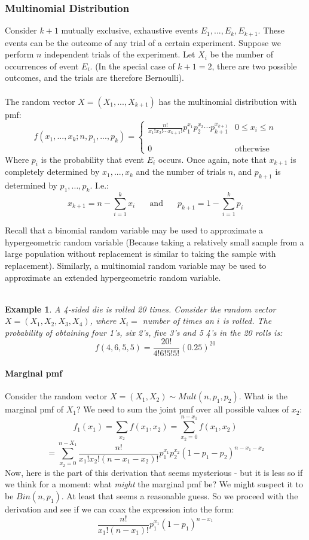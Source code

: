 \documentclass[12pt]{article} %
\newtheorem{example}{Example}
\begin{document}
\subsubsection{Multinomial Distribution}
Consider $k+1$ mutually exclusive, exhaustive events $E_1,...,E_k,E_{k+1}$. These events can be the outcome of any trial of a certain experiment. Suppose we perform $n$ independent trials of the experiment. Let $X_i$ be the number of occurrences of event $E_i$. (In the special case of $k+1=2$, there are two possible outcomes, and the trials are therefore Bernoulli). \\\\
The random vector $X=(X_1,...,X_{k+1})$ has the multinomial distribution with pmf:
$$f(x_1,...,x_k;n,p_1,...,p_k) = \left\{\begin{matrix}\frac{n!}{x_1!x_2!\cdots x_{k+1}!}p_1^{x_1}p_2^{x_2}\cdots p_{k+1}^{x_{k+1}}& 0\leq x_i\leq n\\\\\\ 0&\textrm{otherwise}\end{matrix}\right.$$
Where $p_i$ is the probability that event $E_i$ occurs. Once again, note that $x_{k+1}$ is completely determined by $x_1,...,x_k$ and the number of trials $n$, and $p_{k+1}$ is determined by $p_1,...,p_k$. I.e.:
$$x_{k+1} = n-\sum_{i=1}^k x_i \;\;\;\;\; \textrm{ and } \;\;\;\;\; p_{k+1} = 1-\sum_{i=1}^k p_i$$

Recall that a binomial random variable may be used to approximate a hypergeometric random variable (Because taking a relatively small sample from a large population without replacement is similar to taking the sample with replacement). Similarly, a multinomial random variable may be used to approximate an extended hypergeometric random variable.\\\\
\begin{example}
A 4-sided die is rolled 20 times. Consider the random vector $X=(X_1,X_2,X_3,X_4)$, where $X_i = $ number of times an $i$ is rolled. The probability of obtaining four 1's, six 2's, five 3's and 5 4's in the 20 rolls is:
$$f(4,6,5,5) = \frac{20!}{4!6!5!5!} (0.25)^{20}$$
\end{example} 

\paragraph{Marginal pmf}
Consider the random vector $X=(X_1,X_2)\sim Mult(n,p_1,p_2)$. What is the marginal pmf of $X_1$? We need to sum the joint pmf over all possible values of $x_2$:
$$f_1(x_1) = \sum_{x_2} f(x_1,x_2) = \sum_{x_2=0}^{n-x_1} f(x_1,x_2)$$
$$= \sum_{x_2=0}^{n-X_1} \frac{n!}{x_1!x_2!(n-x_1-x_2)!} p_1^{x_1}p_2^{x_2} \left(1-p_1-p_2\right)^{n-x_1-x_2}$$
Now, here is the part of this derivation that seems mysterious - but it is less so if we think for a moment: what \emph{might} the marginal pmf be? We might suspect it to be $Bin(n,p_1)$. At least that seems a reasonable guess. So we proceed with the derivation and see if we can coax the expression into the form:
$$\frac{n!}{x_1!(n-x_1)!}p_1^{x_1}(1-p_1)^{n-x_1}$$
\end{document}
